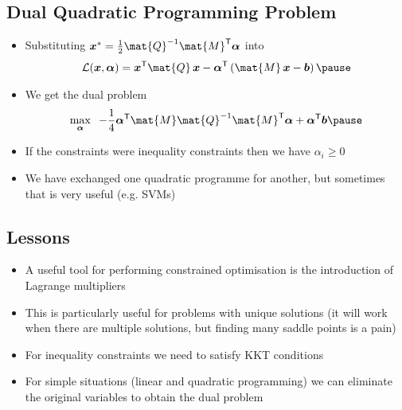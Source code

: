 
\begin{slide}
\section{Dual Quadratic Programming Problem}

\begin{PauseHighLight}
  \begin{itemize}
  \item Substituting $\bm{x}^* = \frac{1}{2} \mat{Q}^{-1} \mat{M}^\tr
    \bm{\alpha}$ into
    \begin{align*}
      \mathcal{L}(\bm{x},\bm{\alpha}) = \bm{x}^\tr \mat{Q}\, \bm{x} -
      \bm{\alpha}^\tr \left( \mat{M}\,\bm{x} - \bm{b}\right)\pause
    \end{align*}
  \item We get the dual problem
    \begin{align*}
      \max_{\bm{\alpha}}
      \;\;-\frac{1}{4} \bm{\alpha}^\tr \mat{M} \mat{Q}^{-1} \mat{M}^\tr
      \bm{\alpha} + \bm{\alpha}^\tr \bm{b}\pause
    \end{align*}
  \item If the constraints were inequality constraints then we have
    $\alpha_i\geq 0$\pause
  \item We have exchanged one quadratic programme for another, but
    sometimes that is very useful (e.g. SVMs)\pause    
  \end{itemize}
\end{PauseHighLight}

\end{slide}


\begin{slide}
\section{Lessons}
\label{last}

\begin{PauseHighLight}
  \begin{itemize}
  \item A useful tool for performing constrained optimisation is the
    introduction of Lagrange multipliers\pause
  \item This is particularly useful for problems with unique solutions
    (it will work when there are multiple solutions, but
    finding many saddle points is a pain)\pause
  \item For inequality constraints we need to satisfy KKT conditions\pause
  \item For simple situations (linear and quadratic programming) we can
    eliminate the original variables to obtain the dual problem\pause
  \end{itemize}
\end{PauseHighLight}

\end{slide}




